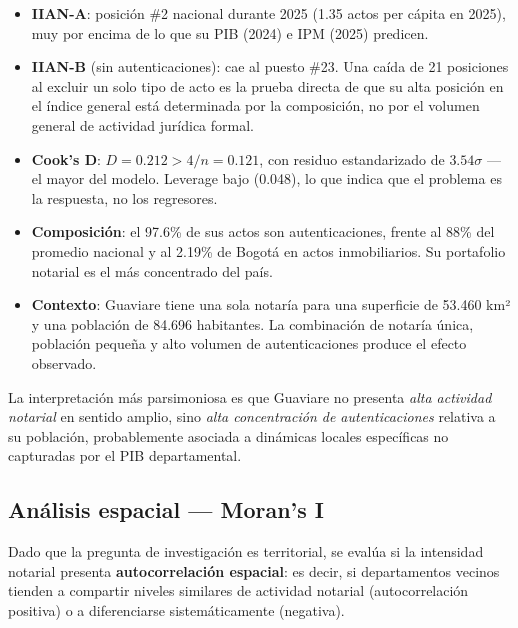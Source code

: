\documentclass{article}
\begin{document}
\begin{itemize}
    \item \textbf{IIAN-A}: posición \#2 nacional durante 2025
    (1.35 actos per cápita en 2025), muy por encima de lo que
    su PIB (2024) e IPM (2025) predicen.
    \item \textbf{IIAN-B} (sin autenticaciones): cae al puesto \#23.
    Una caída de 21 posiciones al excluir un solo tipo de acto es la
    prueba directa de que su alta posición en el índice general está
    determinada por la composición, no por el volumen general de
    actividad jurídica formal.
    \item \textbf{Cook's D}: $D = 0.212 > 4/n = 0.121$, con residuo
    estandarizado de $3.54\sigma$ — el mayor del modelo. Leverage bajo
    (0.048), lo que indica que el problema es la respuesta, no los
    regresores.
    \item \textbf{Composición}: el 97.6\% de sus actos son
    autenticaciones, frente al 88\% del promedio nacional y al 2.19\%
    de Bogotá en actos inmobiliarios. Su portafolio notarial es el
    más concentrado del país.
    \item \textbf{Contexto}: Guaviare tiene una sola notaría para una
    superficie de 53.460 km² y una población de 84.696 habitantes.
    La combinación de notaría única, población pequeña y alto volumen
    de autenticaciones produce el efecto observado.
\end{itemize}

\noindent La interpretación más parsimoniosa es que Guaviare no
presenta \emph{alta actividad notarial} en sentido amplio, sino
\emph{alta concentración de autenticaciones} relativa a su población,
probablemente asociada a dinámicas locales específicas no capturadas
por el PIB departamental.

\subsection{Análisis espacial — Moran's I}
\label{subsec:espacial}

Dado que la pregunta de investigación es territorial, se evalúa si la
intensidad notarial presenta \textbf{autocorrelación espacial}: es decir,
si departamentos vecinos tienden a compartir niveles similares de actividad
notarial (autocorrelación positiva) o a diferenciarse sistemáticamente
(negativa).
\end{document}
